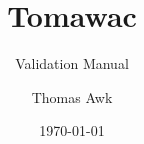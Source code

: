 \documentclass[Tomawac]{../../data/TelemacDoc} %
\begin{document}
\let\cleardoublepage\clearpage

\title{Tomawac}
\subtitle{Validation Manual}
\version{\telmaversion}
\author{Thomas Awk}
\date{\today}
\maketitle
\clearpage



\newpage

\thispagestyle{empty}

\TelemacCopyright{}




\pagestyle{empty} %

\tableofcontents%


\pagestyle{fancy} %







\end{document}

